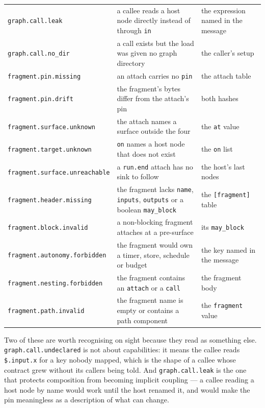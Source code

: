 \begin{longtable}{@{}p{}p{}p{}@{}}
	\texttt{graph.call.leak} & a callee reads a host node directly instead of through \texttt{in} &
	the expression named in the message \\
	\texttt{graph.call.no\_dir} & a call exists but the load was given no graph directory & the
	caller's setup \\
	\texttt{fragment.pin.missing} & an attach carries no \texttt{pin} & the attach table \\
	\texttt{fragment.pin.drift} & the fragment's bytes differ from the attach's pin & both hashes \\
	\texttt{fragment.surface.unknown} & the attach names a surface outside the four & the \texttt{at}
	value \\
	\texttt{fragment.target.unknown} & \texttt{on} names a host node that does not exist & the
	\texttt{on} list \\
	\texttt{fragment.surface.unreachable} & a \texttt{run.end} attach has no sink to follow & the
	host's last nodes \\
	\texttt{fragment.header.missing} & the fragment lacks \texttt{name}, \texttt{inputs},
	\texttt{outputs} or a boolean \texttt{may\_block} & the \texttt{[fragment]} table \\
	\texttt{fragment.block.invalid} & a non-blocking fragment attaches at a pre-surface & its
	\texttt{may\_block} \\
	\texttt{fragment.autonomy.forbidden} & the fragment would own a timer, store, schedule or budget
	& the key named in the message \\
	\texttt{fragment.nesting.forbidden} & the fragment contains an \texttt{attach} or a \texttt{call}
	& the fragment body \\
	\texttt{fragment.path.invalid} & the fragment name is empty or contains a path component & the
	\texttt{fragment} value \\
	\bottomrule
\end{longtable}

Two of these are worth recognising on sight because they read as something else.
\texttt{graph.call.undeclared} is not about capabilities: it means the callee reads
\texttt{\$.input.x} for a key nobody mapped, which is the shape of a callee whose contract grew
without its callers being told. And \texttt{graph.call.leak} is the one that protects composition
from becoming implicit coupling --- a callee reading a host node by name would work until the host
renamed it, and would make the pin meaningless as a description of what can change.

